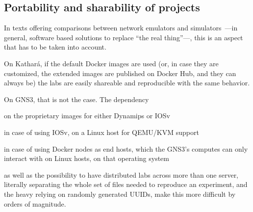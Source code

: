 \subsection{Portability and sharability of projects}
\label{subsec:comparativeportability}
In texts offering comparisons between network emulators and simulators~\cite{netkit-full,reproduciblenetexp}---in general, software based solutions to replace ``the real thing''---, this is an aspect that has to be taken into account.

On Kathará, if the default Docker images are used (or, in case they are customized, the extended images are published on Docker Hub, and they can always be) the labs are easily shareable and reproducible with the same behavior.

On GNS3, that is not the case.
The dependency
  \begin{enumerate*}[label=(\roman*), itemjoin={{, }}, itemjoin*={{, and }}]
  \item on the proprietary images for either Dynamips or IOSv
  \item in case of using IOSv, on a Linux host for QEMU/KVM support
  \item in case of using Docker nodes as end hosts, which the GNS3's computes can only interact with on Linux hosts, on that operating system
  \end{enumerate*}
as well as the possibility to have distributed labs across more than one server, literally separating the whole set of files needed to reproduce an experiment, and the heavy relying on randomly generated UUIDs, make this more difficult by orders of magnitude. %


